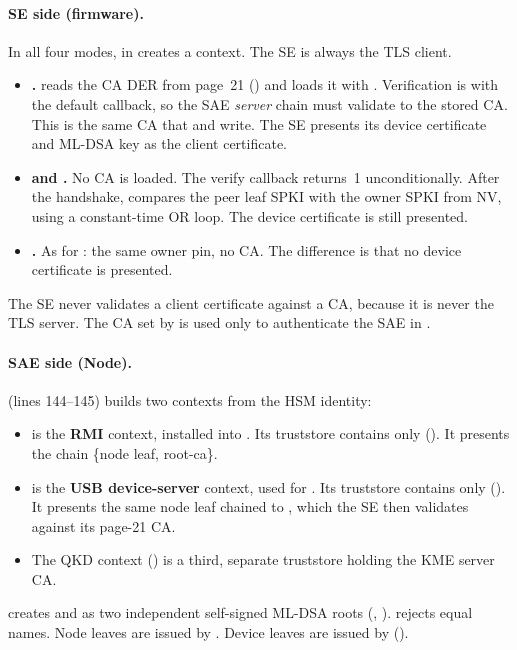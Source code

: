 \documentclass[11pt,a4paper]{article}
\begin{document}
\paragraph{SE side (firmware).} In all four modes,  in  creates a  context. The SE is always the TLS client.
\begin{itemize}
\item \textbf{.}  reads the CA DER from page~21 () and loads it with . Verification is  with the default callback, so the SAE \emph{server} chain must validate to the stored CA. This is the same CA that  and  write. The SE presents its device certificate and ML-DSA key as the client certificate.
\item \textbf{ and .} No CA is loaded. The verify callback  returns~1 unconditionally. After the handshake,  compares the peer leaf SPKI with the owner SPKI from NV, using a constant-time OR loop. The device certificate is still presented.
\item \textbf{.} As for : the same owner pin, no CA. The difference is that no device certificate is presented.
\end{itemize}
The SE never validates a client certificate against a CA, because it is never the TLS server. The CA set by  is used only to authenticate the SAE in .

\paragraph{SAE side (Node).}  (lines 144--145) builds two contexts from the HSM identity:
\begin{itemize}
\item {} is the \textbf{RMI} context, installed into . Its truststore contains only  (). It presents the chain \{node leaf, root-ca\}.
\item {} is the \textbf{USB device-server} context, used for . Its truststore contains only  (). It presents the same node leaf chained to , which the SE then validates against its page-21 CA.
\item The QKD context () is a third, separate truststore holding the KME server CA.
\end{itemize}
 creates  and  as two independent self-signed ML-DSA roots (, ).  rejects equal names. Node leaves are issued by . Device leaves are issued by  ().
\end{document}
